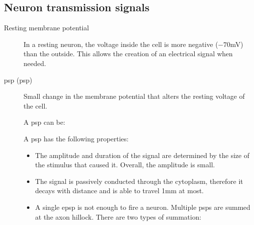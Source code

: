\subsection{Neuron transmission signals}

\begin{description}
    \item[Resting membrane potential] 
        In a resting neuron, the voltage inside the cell is more negative ($-70$mV) than the outside.
        This allows the creation of an electrical signal when needed.

    \item[\Acl{psp} (\ac{psp})] 
        Small change in the membrane potential that alters the resting voltage of the cell.
        
        A \ac{psp} can be:

        A \ac{psp} has the following properties:
        \begin{itemize}
            \item The amplitude and duration of the signal are determined by the size of the stimulus that caused it.
                Overall, the amplitude is small.
            \item The signal is passively conducted through the cytoplasm, therefore it decays with distance and is able to travel 1mm at most.
            \item A single \acs{epsp} is not enough to fire a neuron. Multiple \acp{psp} are summed at the axon hillock.
                There are two types of summation:


\end{itemize}
\end{description}
